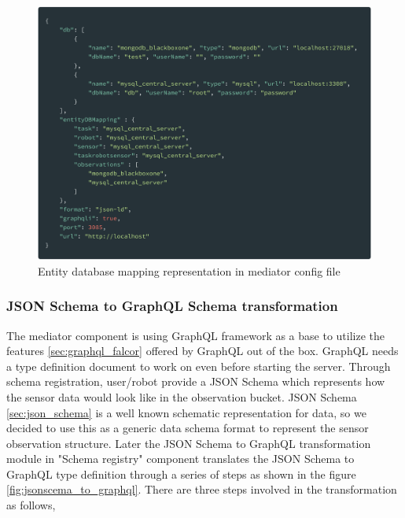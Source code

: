 	\begin{figure}[!htbp] 
		\begin{center}
			\includegraphics[scale=0.1]{./images/png/implementation/entity_db_mapping}	
			\caption{Entity database mapping representation in mediator config file}	
			\label{fig:entity_db_mapping}	
		\end{center}
	\end{figure}

	\subsubsection{JSON Schema to GraphQL Schema transformation} \label{subsubsection:jsonschema_graphqlschema}
	
	The mediator component is using GraphQL framework as a base to utilize the features \ref{sec:graphql_falcor} offered by GraphQL out of the box. GraphQL needs a type definition document to work on even before starting the server.  Through schema registration, user/robot provide a JSON Schema which represents how the sensor data would look like in the observation bucket.  JSON Schema \ref{sec:json_schema} is a well known schematic representation for data, so we decided to use this as a generic data schema format to represent the sensor observation structure. Later the JSON Schema to GraphQL transformation module in "Schema registry" component translates the JSON Schema to GraphQL type definition through a series of steps as shown in the figure \ref{fig:jsonscema_to_graphql}. There are three steps involved in the transformation as follows,
	
